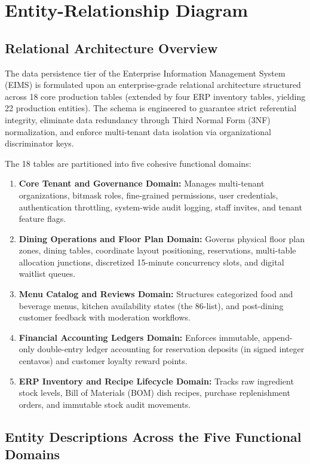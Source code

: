 \chapter{Entity-Relationship Diagram}
\label{chap:erd}

\section{Relational Architecture Overview}
\label{sec:erd_overview}
The data persistence tier of the Enterprise Information Management System (EIMS) is formulated upon an enterprise-grade relational architecture structured across 18 core production tables (extended by four ERP inventory tables, yielding 22 production entities). The schema is engineered to guarantee strict referential integrity, eliminate data redundancy through Third Normal Form (3NF) normalization, and enforce multi-tenant data isolation via organizational discriminator keys.

The 18 tables are partitioned into five cohesive functional domains:
\begin{enumerate}
    \item \textbf{Core Tenant and Governance Domain:} Manages multi-tenant organizations, bitmask roles, fine-grained permissions, user credentials, authentication throttling, system-wide audit logging, staff invites, and tenant feature flags.
    \item \textbf{Dining Operations and Floor Plan Domain:} Governs physical floor plan zones, dining tables, coordinate layout positioning, reservations, multi-table allocation junctions, discretized 15-minute concurrency slots, and digital waitlist queues.
    \item \textbf{Menu Catalog and Reviews Domain:} Structures categorized food and beverage menus, kitchen availability states (the 86-list), and post-dining customer feedback with moderation workflows.
    \item \textbf{Financial Accounting Ledgers Domain:} Enforces immutable, append-only double-entry ledger accounting for reservation deposits (in signed integer centavos) and customer loyalty reward points.
    \item \textbf{ERP Inventory and Recipe Lifecycle Domain:} Tracks raw ingredient stock levels, Bill of Materials (BOM) dish recipes, purchase replenishment orders, and immutable stock audit movements.
\end{enumerate}

\section{Entity Descriptions Across the Five Functional Domains}
\label{sec:erd_domains}

